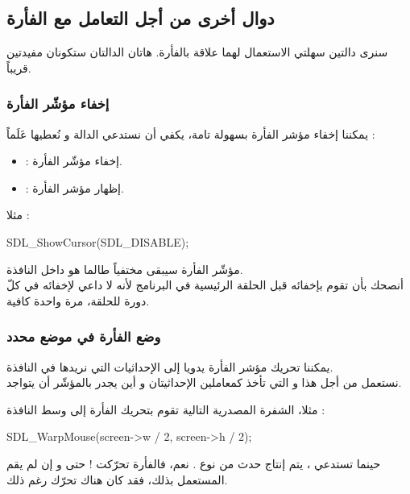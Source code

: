 \subsection{دوال أخرى من أجل التعامل مع الفأرة}

سنرى دالتين سهلتي الاستعمال لهما علاقة بالفأرة. هاتان الدالتان ستكونان مفيدتين قريباً.

\subsubsection{إخفاء مؤشّر الفأرة}

يمكننا إخفاء مؤشر الفأرة بسهولة تامة، يكفي أن نستدعي الدالة
و نُعطيها عَلَماً :

\begin{itemize}
	\item {} :
	إخفاء مؤشّر الفأرة.
	\item {} :
	إظهار مؤشر الفأرة.
\end{itemize}
مثلا :

\begin{Csource}
SDL_ShowCursor(SDL_DISABLE);
\end{Csource}

مؤشّر الفأرة سيبقى مختفياً طالما هو داخل النافذة.\\
أنصحك بأن تقوم بإخفائه قبل الحلقة الرئيسية في البرنامج لأنه لا داعي لإخفائه في كلّ دورة للحلقة، مرة واحدة كافية.

\subsubsection{وضع الفأرة في موضع محدد}

يمكننا تحريك مؤشر الفأرة يدويا إلى الإحداثيات التي نريدها في النافذة.\\
نستعمل من أجل هذا
و التي تأخذ كمعاملين الإحداثيتان
و 
أين يجدر بالمؤشّر أن يتواجد.

مثلا، الشفرة المصدرية التالية تقوم بتحريك الفأرة إلى وسط النافذة :

\begin{Csource}
SDL_WarpMouse(screen->w / 2, screen->h / 2);
\end{Csource}

\begin{information}
حينما تستدعي
،
يتم إنتاج حدث من نوع
.
نعم، فالفأرة تحرّكت ! حتى و إن لم يقم المستعمل بذلك، فقد كان هناك تحرّك رغم ذلك.
\end{information}


